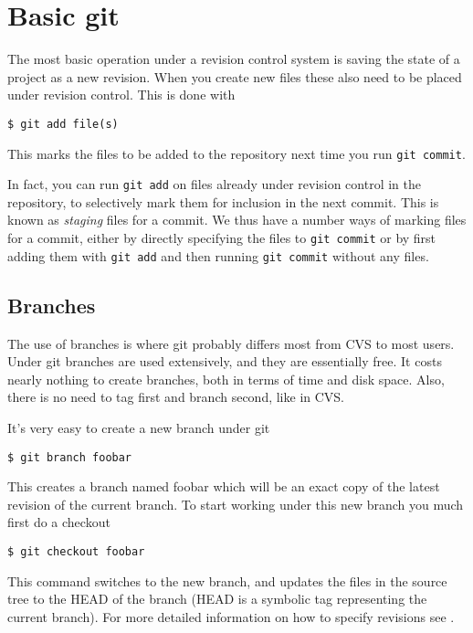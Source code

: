 \documentclass[a4paper,10pt]{article}
\begin{document}
\section{Basic git}
The most basic operation under a revision control system is saving the state of
a project as a new revision. When you create new files  
these also need to be placed under revision control. This is done with
\begin{verbatim}
$ git add file(s)
\end{verbatim}
This marks the files to be added to the repository next time you run 
\texttt{git commit}. 

In fact, you can run \texttt{git add} on files already
under revision control in the repository, to selectively mark them for
inclusion in the next commit. This is known as \emph{staging} files for a
commit. We thus have a number ways of marking files for a commit, either by
directly specifying the files to \texttt{git commit} or by first adding them
with \texttt{git add} and then running \texttt{git commit} without any files. 

\subsection{Branches}
The use of branches is where git probably differs most from CVS to most users.
Under git branches are used extensively, and they are essentially
free. It costs nearly nothing to create branches, both in terms of time and
disk space. Also, there is no need to tag first and branch second, like in CVS.

It's very easy to create a new branch under git
\begin{verbatim}
$ git branch foobar
\end{verbatim}
This creates a branch named foobar which will be an exact copy of the latest
revision of the current branch. To start working under this new branch you
much first do a checkout
\begin{verbatim}
$ git checkout foobar
\end{verbatim}
This command switches to the new branch, and updates the files in the source
tree to the HEAD of the branch (HEAD is a symbolic tag representing
the current branch). For more detailed information on
how to specify revisions see .
\end{document}
